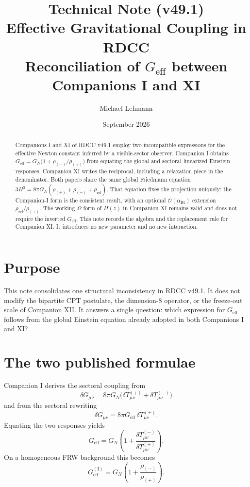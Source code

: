 \documentclass[11pt,a4paper]{article}
\title{\textbf{Technical Note (v49.1)}\\[0.2cm]
\textbf{Effective Gravitational Coupling in RDCC}\\[0.15cm]
\large Reconciliation of \(G_{\mathrm{eff}}\) between Companions I and XI}
\author[1]{Michael Lehmann}
\affil[1]{\small Independent Researcher, Relaxation-Driven Cyclic Cosmology (RDCC)\\
\texttt{mi.lehmann@gmx.de}}
\date{September 2026}
\begin{document}
\maketitle

\begin{abstract}
Companions I and XI of RDCC v49.1 employ two incompatible expressions for the
effective Newton constant inferred by a visible-sector observer. Companion I
obtains
\(G_{\mathrm{eff}}=G_N\bigl(1+\rho_{(-)}/\rho_{(+)}\bigr)\)
from equating the global and sectoral linearized Einstein responses.
Companion XI writes the reciprocal, including a relaxation piece in the
denominator. Both papers share the same global Friedmann equation
\(3H^2=8\pi G_N(\rho_{(+)}+\rho_{(-)}+\rho_{\mathrm{rel}})\). That equation
fixes the projection uniquely: the Companion-I form is the consistent
result, with an optional \(\mathcal{O}(\alpha_{\mathrm{IR}})\) extension
\(\rho_{\mathrm{rel}}/\rho_{(+)}\). The working \(\Omega\)-form of \(H(z)\)
in Companion XI remains valid and does not require the inverted
\(G_{\mathrm{eff}}\). This note records the algebra and the replacement rule
for Companion XI. It introduces no new parameter and no new interaction.
\end{abstract}

\tableofcontents
\newpage

\section{Purpose}

This note consolidates one structural inconsistency in RDCC v49.1. It does
not modify the bipartite CPT postulate, the dimension-8 operator, or the
freeze-out scale of Companion XII. It answers a single question: which
expression for \(G_{\mathrm{eff}}\) follows from the global Einstein
equation already adopted in both Companions I and XI?

\section{The two published formulae}

Companion I derives the sectoral coupling from
\begin{equation}
  \delta G_{\mu\nu}
  =
  8\pi G_N
  \bigl(
    \delta T^{(+)}_{\mu\nu}
    +
    \delta T^{(-)}_{\mu\nu}
  \bigr)
\end{equation}
and from the sectoral rewriting
\begin{equation}
  \delta G_{\mu\nu}
  =
  8\pi G_{\mathrm{eff}}\,
  \delta T^{(+)}_{\mu\nu}.
\end{equation}
Equating the two responses yields
\begin{equation}
  G_{\mathrm{eff}}
  =
  G_N
  \left(
    1
    +
    \frac{\delta T^{(-)}_{\mu\nu}}{\delta T^{(+)}_{\mu\nu}}
  \right).
  \label{eq:Ilinear}
\end{equation}
On a homogeneous FRW background this becomes
\begin{equation}
  G_{\mathrm{eff}}^{\mathrm{(I)}}
  =
  G_N
  \left(
    1
    +
    \frac{\rho_{(-)}}{\rho_{(+)}}
  \right).
  \label{eq:GI}
\end{equation}
\end{document}
